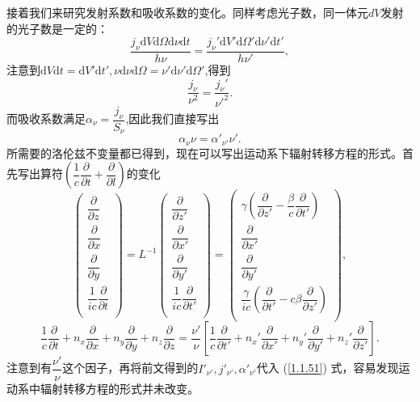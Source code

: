 \documentclass[../天体物理基础.tex]{subfiles}
\begin{document}
接着我们来研究发射系数和吸收系数的变化。同样考虑光子数，同一体元$dV$发射的光子数是一定的：
\begin{equation}
\frac{j_\nu\mathrm{d}V\mathrm{d}\Omega\mathrm{d}\nu\mathrm{d}t}{h\nu}=\frac{j_\nu'\mathrm{d}V'\mathrm{d}\Omega'\mathrm{d}\nu'\mathrm{d}t'}{h\nu'},
\end{equation}
注意到$\mathrm{d}V\mathrm{d}t=\mathrm{d}V'\mathrm{d}t',\nu\mathrm{d}\nu\mathrm{d}\Omega=\nu'\mathrm{d}\nu'\mathrm{d}\Omega'$,得到
\begin{equation}
\frac{j_\nu}{\nu^2}=\frac{j_\nu'}{\nu'^2}.
\end{equation}
而吸收系数满足$\alpha_{\nu}=\dfrac{j_{\nu}}{S_{\nu}}$,因此我们直接写出
\begin{equation}
\alpha_{\nu}\nu=\alpha'_{\nu'}\nu'.
\end{equation}
所需要的洛伦兹不变量都已得到，现在可以写出运动系下辐射转移方程的形式。首先写出算符$\left(\dfrac{1}{c}\dfrac{\partial{}}{\partial{}t}+\dfrac{\partial{}}{\partial{}l}\right)$的变化
\begin{equation}
\begin{pmatrix}
\dfrac{\partial}{\partial z}\\
\dfrac{\partial}{\partial x}\\
\dfrac{\partial}{\partial y}\\
\dfrac1{ic}\dfrac{\partial}{\partial t}\\
\end{pmatrix}
=L^{-1}
\begin{pmatrix}
\dfrac{\partial}{\partial z'}\\
\dfrac{\partial}{\partial x'}\\
\dfrac{\partial}{\partial y'}\\
\dfrac1{ic}\dfrac{\partial}{\partial t'}\\
\end{pmatrix}
=\begin{pmatrix}
\gamma(\dfrac{\partial}{\partial z'}-\dfrac{\beta}c\dfrac{\partial}{\partial t'})\\
\dfrac{\partial}{\partial x'}\\
\dfrac{\partial}{\partial y'}\\
\dfrac\gamma{ic}(\dfrac{\partial}{\partial t'}-c\beta\dfrac{\partial}{\partial z'})\\
\end{pmatrix},
\end{equation}
\begin{equation}
\frac1c\frac{\partial }{\partial t}+n_{x}\frac{\partial}{\partial x}+n_{y}\frac{\partial}{\partial y}+n_{z}\frac{\partial}{\partial z}=\frac{\nu'}{\nu}[\frac1c\frac{\partial}{\partial t'}+n_{x}'\frac{\partial}{\partial x'}+n_{y}'\frac{\partial}{\partial y'}+n_{z}'\frac{\partial}{\partial z'}].
\end{equation}
注意到有$\dfrac{\nu'}{\nu}$这个因子，再将前文得到的$I'_{\nu'},j'_{\nu'},\alpha'_{\nu'}$代入 (\ref{1.1.51}) 式，容易发现运动系中辐射转移方程的形式并未改变。
\end{document}
